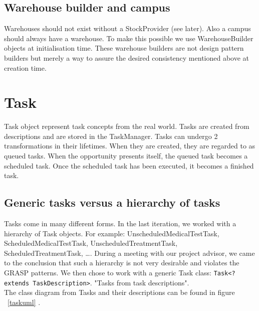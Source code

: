 \documentclass[12pt]{article}
\begin{document}
\subsection{Warehouse builder and campus}
Warehouses should not exist without a StockProvider (see later). Also a campus should always have a warehouse. To make this possible we use WarehouseBuilder objects at initialisation time. These warehouse builders are not design pattern builders but merely a way to assure the desired consistency mentioned above at creation time.

\section{Task}
Task object represent task concepts from the real world. Tasks are created from descriptions and are stored in the TaskManager. Tasks can undergo 2 transformations in their lifetimes. When they are created, they are regarded to as queued tasks. When the opportunity presents itself, the queued task becomes a scheduled task. Once the scheduled task has been executed, it becomes a finished task.
\subsection{Generic tasks versus a hierarchy of tasks}
Tasks come in many different forms. In the last iteration, we worked with a hierarchy of Task objects. For example: UnscheduledMedicalTestTask, ScheduledMedicalTestTask, UnscheduledTreatmentTask, ScheduledTreatmentTask, \dots . During a meeting with our project advisor, we came to the conclusion that such a hierarchy is not very desirable and violates the GRASP patterns. We then chose to work with a generic Task class: \texttt{Task<? extends TaskDescription>}. "Tasks from task descriptions".\\
The class diagram from Tasks and their descriptions can be found in figure ~\ref{taskuml} .
\end{document}
